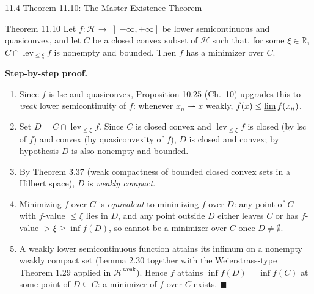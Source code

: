 \documentclass[aspectratio=169,10pt]{beamer}
\newcommand{\mHH}{\mathcal H}
\newcommand{\R}{\mathbb{R}}
\newcommand{\lev}{\operatorname{lev}}
\begin{document}
\begin{frame}{11.4 Theorem 11.10: The Master Existence Theorem}

  \begin{alertblock}{Theorem 11.10}
    Let $f:\mHH\to\left]-\infty,+\infty\right]$ be lower
    semicontinuous and quasiconvex, and let $C$ be a closed convex
    subset of $\mHH$ such that, for some $\xi\in\R$,
    $C\cap\lev_{\le\xi}f$ is nonempty and bounded. Then $f$ has a
    minimizer over $C$.
  \end{alertblock}

  \textbf{Step-by-step proof.}
  \begin{enumerate}
    \item Since $f$ is lsc and quasiconvex, Proposition 10.25 (Ch.\
          10) upgrades this to \emph{weak} lower semicontinuity of
          $f$: whenever $x_n\rightharpoonup x$ weakly,
          $f(x)\le\varliminf f(x_n)$.
    \item Set $D=C\cap\lev_{\le\xi}f$. Since $C$ is closed convex and
          $\lev_{\le\xi}f$ is closed (by lsc of $f$) and convex (by
          quasiconvexity of $f$), $D$ is closed and convex; by
          hypothesis $D$ is also nonempty and bounded.
    \item By Theorem 3.37 (weak compactness of bounded closed convex
          sets in a Hilbert space), $D$ is \emph{weakly compact}.
    \item Minimizing $f$ over $C$ is \emph{equivalent} to minimizing
          $f$ over $D$: any point of $C$ with $f$-value $\le\xi$ lies
          in $D$, and any point outside $D$ either leaves $C$ or has
          $f$-value $>\xi\ge\inf f(D)$, so cannot be a minimizer over
          $C$ once $D\neq\emptyset$.
    \item A weakly lower semicontinuous function attains its infimum
          on a nonempty weakly compact set (Lemma 2.30 together with
          the Weierstrass-type Theorem 1.29 applied in $\mHH^{\mathrm{weak}}$).
          Hence $f$ attains $\inf f(D)=\inf f(C)$ at some point of
          $D\subseteq C$: a minimizer of $f$ over $C$ exists.
          \hfill$\blacksquare$
  \end{enumerate}

\end{frame}
\end{document}
